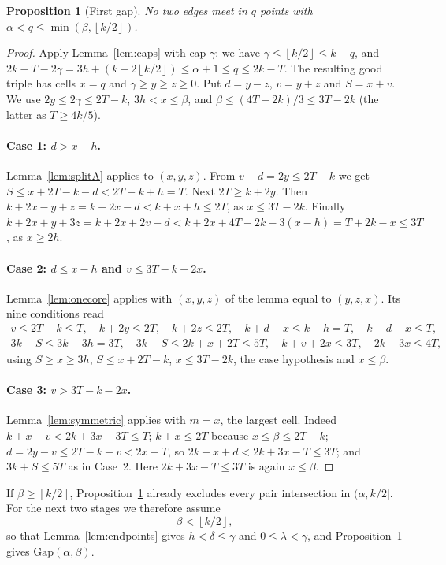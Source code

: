 \documentclass[11pt]{article}
\numberwithin{equation}{section}
\newtheorem{proposition}[theorem]{Proposition}
\theoremstyle{definition}
\theoremstyle{remark}
\newcommand{\floor}[1]{\left\lfloor #1\right\rfloor}
\newcommand{\Gap}{\mathrm{Gap}}
\begin{document}
\begin{proposition}[First gap]\label{prop:gapone}
No two edges meet in $q$ points with $\alpha<q\le\min(\beta,\floor{k/2})$.
\end{proposition}

\begin{proof}
Apply Lemma~\ref{lem:caps} with cap $\gamma$: we have
$\gamma\le\floor{k/2}\le k-q$, and
$2k-T-2\gamma=3h+(k-2\floor{k/2})\le\alpha+1\le q\le2k-T$. The resulting
good triple has cells $x=q$ and $\gamma\ge y\ge z\ge0$. Put $d=y-z$,
$v=y+z$ and $S=x+v$. We use $2y\le2\gamma\le2T-k$, $3h<x\le\beta$, and
$\beta\le(4T-2k)/3\le3T-2k$ (the latter as $T\ge4k/5$).

\paragraph{Case 1: $d>x-h$.} Lemma~\ref{lem:splitA} applies to $(x,y,z)$.
From $v+d=2y\le2T-k$ we get $S\le x+2T-k-d<2T-k+h=T$. Next $2T\ge k+2y$.
Then $k+2x-y+z=k+2x-d<k+x+h\le2T$, as $x\le3T-2k$. Finally
$k+2x+y+3z=k+2x+2v-d<k+2x+4T-2k-3(x-h)=T+2k-x\le3T$, as $x\ge2h$.

\paragraph{Case 2: $d\le x-h$ and $v\le3T-k-2x$.} Lemma~\ref{lem:onecore}
applies with $(x,y,z)$ of the lemma equal to $(y,z,x)$. Its nine
conditions read
\begin{gather*}
 v\le2T-k\le T,\quad k+2y\le2T,\quad k+2z\le2T,\quad
 k+d-x\le k-h=T,\quad k-d-x\le T,\\
 3k-S\le3k-3h=3T,\quad 3k+S\le2k+x+2T\le5T,\quad k+v+2x\le3T,\quad
 2k+3x\le4T,
\end{gather*}
using $S\ge x\ge3h$, $S\le x+2T-k$, $x\le3T-2k$, the case hypothesis
and $x\le\beta$.

\paragraph{Case 3: $v>3T-k-2x$.} Lemma~\ref{lem:symmetric} applies with
$m=x$, the largest cell. Indeed $k+x-v<2k+3x-3T\le T$; $k+x\le2T$ because
$x\le\beta\le2T-k$; $d=2y-v\le2T-k-v<2x-T$, so $2k+x+d<2k+3x-T\le3T$; and
$3k+S\le5T$ as in Case~2. Here $2k+3x-T\le3T$ is again $x\le\beta$.
\end{proof}

If $\beta\ge\floor{k/2}$, Proposition~\ref{prop:gapone} already excludes
every pair intersection in $(\alpha,k/2]$. For the next two stages we
therefore assume
\begin{equation}\label{eq:branch}
 \beta<\floor{k/2},
\end{equation}
so that Lemma~\ref{lem:endpoints} gives $h<\delta\le\gamma$ and
$0\le\lambda<\gamma$, and Proposition~\ref{prop:gapone} gives
$\Gap(\alpha,\beta)$.
\end{document}

